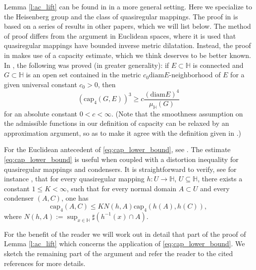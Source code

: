 \documentclass[10pt,letterpaper]{amsart}
\theoremstyle{definition}
\numberwithin{thm}{subsection}
\numberwithin{equation}{section}
\begin{document}
Lemma \ref{l:ac_lift} can be found in \cite[Lemma 7]{MR2679532} in a more general setting. Here we specialize to the Heisenberg group and the class of quasiregular mappings.
The proof in \cite{MR2679532} is based on a series of results in other papers, which we will list below. The method of proof differs from the argument in Euclidean spaces, where it is used that quasiregular mappings have bounded inverse metric dilatation. Instead, the proof in \cite{MR2679532} makes use of a capacity estimate, which we think deserves to be better known. In \cite[Lemma 5]{MR1654140}, the following was proved (in greater generality): if $E\subset \mathbb{H}$ is connected and $G\subset\mathbb{H}$ is an open set contained in the metric $c_0 \mathrm{diam}E$-neighborhood of $E$ for a given universal constant $c_0>0$, then
\begin{equation}\label{eq:cap_lower_bound}
\left(\mathrm{cap}_4(G,E)\right)^3 \geq  c \frac{(\mathrm{diam}E)^4}{\mu_{\mathbb{H}}(G)}
\end{equation}
for an absolute constant $0<c<\infty$. (Note that the smoothness assumption on the admissible functions in our definition of capacity can be relaxed by an approximation argument, so as to make it agree with the definition given in \cite{MR1654140}.)

For the Euclidean antecedent of \eqref{eq:cap_lower_bound}, see \cite[Lemma 5.9]{MR0259114}. The estimate \eqref{eq:cap_lower_bound} is useful when coupled with a distortion inequality for quasiregular mappings and condensers.
It is straightforward to verify, see for instance \cite[Proposition 2]{MR2679532},  that for every quasiregular mapping $h:U \to \mathbb{H}$, $U\subseteq \mathbb{H}$, there exists a constant $1\leq K<\infty$, such that for every normal domain $A \subset U$ and every condenser $(A,C)$, one has
\begin{equation}\label{eq:cap_est}
\mathrm{cap}_4(A,C)\leq K N(h,A)\mathrm{cap}_4(h(A),h(C)),
\end{equation}
where $N(h,A):= \sup_{x\in \mathbb{H}}\sharp(h^{-1}(x)\cap A)$.

For the benefit of the reader we will work out in detail that part of the proof of Lemma \ref{l:ac_lift} which concerns the application of \eqref{eq:cap_lower_bound}.
We sketch the remaining part of the argument and refer the reader to the cited references for more details.
\end{document}
